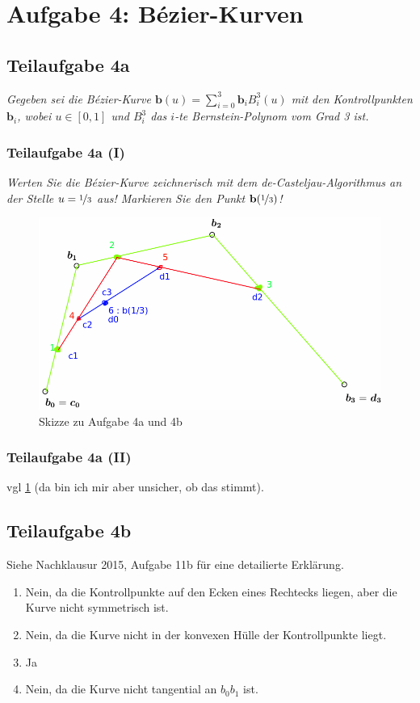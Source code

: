 \documentclass[a4paper]{scrartcl}
\begin{document}
\clearpage
\section*{Aufgabe 4: Bézier-Kurven}
\subsection*{Teilaufgabe 4a}
\textit{Gegeben sei die Bézier-Kurve $\mathbf{b}(u) = \sum_{i=0}^3 \mathbf{b}_i B_i^3(u)$ mit den Kontrollpunkten $\mathbf{b}_i$, wobei
$u \in [0, 1]$ und $B_i^3$ das $i$-te Bernstein-Polynom vom Grad 3 ist.}

\subsubsection*{Teilaufgabe 4a (I)}
\textit{Werten Sie die Bézier-Kurve zeichnerisch mit dem de-Casteljau-Algorithmus
an der Stelle $u = \nicefrac{1}{3}$ aus! Markieren Sie den Punkt $\mathbf{b}(\nicefrac{1}{3})$!}

\begin{figure}[h]
    \centering
    \includegraphics*[width=0.8\linewidth, keepaspectratio]{4ab.png}
    \caption{Skizze zu Aufgabe 4a und 4b}
    \label{fig:4ab}
\end{figure}

\subsubsection*{Teilaufgabe 4a (II)}
vgl \cref{fig:4ab} (da bin ich mir aber unsicher, ob das stimmt).

\subsection*{Teilaufgabe 4b}
Siehe Nachklausur 2015, Aufgabe 11b für eine detailierte Erklärung.

\begin{enumerate}
    \item Nein, da die Kontrollpunkte auf den Ecken eines Rechtecks liegen,
          aber die Kurve nicht symmetrisch ist.
    \item Nein, da die Kurve nicht in der konvexen Hülle der Kontrollpunkte
          liegt.
    \item Ja
    \item Nein, da die Kurve nicht tangential an $b_0 b_1$ ist.
\end{enumerate}
\end{document}
